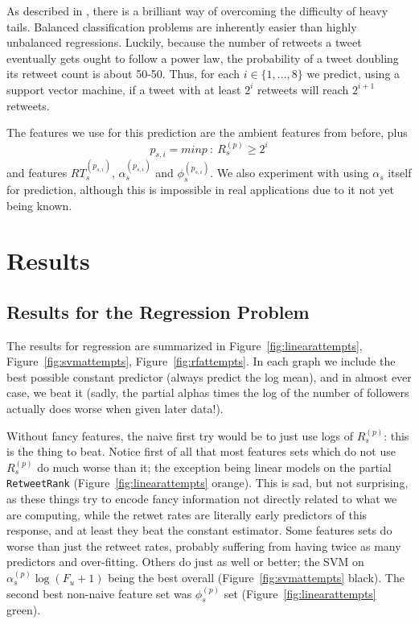 As described in \cite{DBLP:journals/corr/ChengADKL14}, there is a brilliant way of overcoming the difficulty of heavy tails.
Balanced classification problems are inherently easier than highly unbalanced regressions.
Luckily, because the number of retweets a tweet eventually gets ought to follow a power law, the probability of a tweet doubling its retweet count is about 50-50.  
Thus, for each $i\in\{1,...,8\}$ we predict, using a support vector machine, if a tweet with at least $2^i$ retweets will reach $2^{i+1}$ retweets.

The features we use for this prediction are the ambient features from before, plus
\[p_{s,i}=min p~:~R_s^{(p)}\ge 2^i\]
and features $RT^{(p_{s,i})}_s$, $\alpha^{(p_{s,i})}_s$ and $\phi^{(p_{s,i})}_s$.
We also experiment with using $\alpha_s$ itself for prediction, although this is impossible in real applications due to it not yet being known.  


\section{Results}

\subsection{Results for the Regression Problem}

The results for regression are summarized in Figure~\ref{fig:linearattempts}, Figure~\ref{fig:svmattempts}, Figure~\ref{fig:rfattempts}.  
In each graph we include the best possible constant predictor (always predict the log mean), and in almost ever case, we beat it (sadly, the partial alphas times the log of the number of followers actually does worse when given later data!).

Without fancy features, the naive first try would be to just use logs of $R_s^{(p)}$: this is the thing to beat.
Notice first of all that most features sets which do not use $R_s^{(p)}$ do much worse than it; the exception being linear models on the partial \texttt{RetweetRank} (Figure~\ref{fig:linearattempts} orange).  
This is sad, but not surprising, as these things try to encode fancy information not directly related to what we are computing, while the retwet rates are literally early predictors of this response, and at least they beat the constant estimator.  
Some features sets do worse than just the retweet rates, probably suffering from having twice as many predictors and over-fitting.
Others do just as well or better; the SVM on $\alpha_s^{(p)}\log(F_u+1)$ being the best overall (Figure~\ref{fig:svmattempts} black).  
The second best non-naive feature set was $\phi_s^{(p)}$ set (Figure~\ref{fig:linearattempts} green).  

